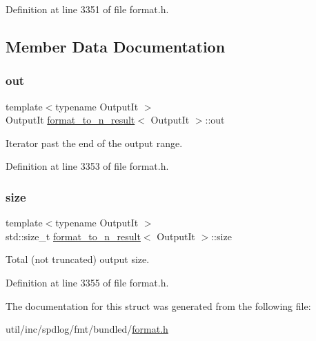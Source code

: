 Definition at line 3351 of file format.\+h.



\subsection{Member Data Documentation}
\mbox{\label{structformat__to__n__result_a90597c6c1d23c7301aef16e756c6263b}} 
\subsubsection{\texorpdfstring{out}{out}}
{\footnotesize\ttfamily template$<$typename Output\+It $>$ \\
Output\+It \hyperlink{structformat__to__n__result}{format\+\_\+to\+\_\+n\+\_\+result}$<$ Output\+It $>$\+::out}

Iterator past the end of the output range. 

Definition at line 3353 of file format.\+h.

\mbox{\label{structformat__to__n__result_a5d0924cddcfab39a1c38ff0e75cbe5bf}} 
\subsubsection{\texorpdfstring{size}{size}}
{\footnotesize\ttfamily template$<$typename Output\+It $>$ \\
std\+::size\+\_\+t \hyperlink{structformat__to__n__result}{format\+\_\+to\+\_\+n\+\_\+result}$<$ Output\+It $>$\+::size}

Total (not truncated) output size. 

Definition at line 3355 of file format.\+h.



The documentation for this struct was generated from the following file\+:\begin{DoxyCompactItemize}
\item 
util/inc/spdlog/fmt/bundled/\hyperlink{format_8h}{format.\+h}\end{DoxyCompactItemize}
